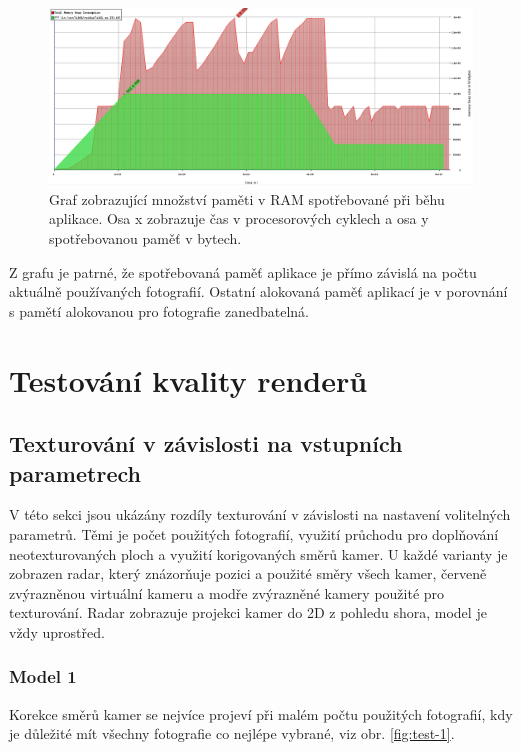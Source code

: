 \documentclass[11pt,twoside,a4paper]{book}
\begin{document}
\begin{figure}[h]
\begin{center}
\includegraphics[width=\textwidth]{figures/massif}
\caption{Graf zobrazující množství paměti v RAM spotřebované při běhu aplikace. Osa x zobrazuje čas v procesorových cyklech a osa y spotřebovanou paměť v bytech.}
\label{fig:massif}
\end{center}
\end{figure}

Z grafu je patrné, že spotřebovaná paměť aplikace je přímo závislá na počtu aktuálně používaných fotografií. Ostatní alokovaná paměť aplikací je v porovnání s pamětí alokovanou pro fotografie zanedbatelná.

\section{Testování kvality renderů}
\label{sec:renders}
\subsection{Texturování v závislosti na vstupních parametrech}

V této sekci jsou ukázány rozdíly texturování v závislosti na nastavení volitelných parametrů. Těmi je počet použitých fotografií, využití průchodu pro doplňování neotexturovaných ploch a využití korigovaných směrů kamer. U každé varianty je zobrazen radar, který znázorňuje pozici a použité směry všech kamer, červeně zvýrazněnou virtuální kameru a modře zvýrazněné kamery použité pro texturování. Radar zobrazuje projekci kamer do 2D z pohledu shora, model je vždy uprostřed.

\subsubsection*{Model 1}
Korekce směrů kamer se nejvíce projeví při malém počtu použitých fotografií, kdy je důležité mít všechny fotografie co nejlépe vybrané, viz obr.  \ref{fig:test-1}. 
\end{document}
